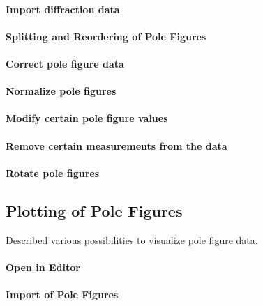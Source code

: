 \documentclass{article}
\begin{document}
			\paragraph{Import diffraction data}
		
			\paragraph{Splitting and Reordering of Pole Figures}
		
			\paragraph{Correct pole figure data}
		
			\paragraph{Normalize pole figures}
		
			\paragraph{Modify certain pole figure values}
		
			\paragraph{Remove certain measurements from the data}
		
			\paragraph{Rotate pole figures}
		
		\subsection{Plotting of Pole Figures}

		
                     \begin{par}
Described various possibilities to visualize pole figure data.
\end{par} \vspace{1em}

                  
			\paragraph{Open in Editor}
		
			\paragraph{Import of Pole Figures}
		
\end{document}
